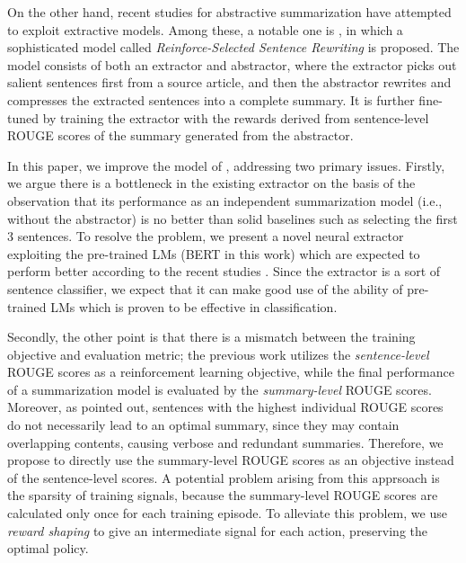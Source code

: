 \documentclass[11pt,a4paper]{article}
\begin{document}
On the other hand, recent 
studies for abstractive summarization \cite{chen-bansal-2018-fast, hsu-etal-2018-unified, gehrmann-etal-2018-bottom} have attempted to exploit extractive models.
Among these, a notable one is \citet{chen-bansal-2018-fast}, in which a sophisticated model called \emph{Reinforce-Selected Sentence Rewriting} is proposed.
The model consists of both an extractor and abstractor, where the extractor picks out salient sentences first from a source article, and then the abstractor rewrites and compresses the extracted sentences into a complete summary. 
It is further fine-tuned by training the extractor with the rewards derived from sentence-level ROUGE scores of the summary generated from the abstractor.



In this paper, we improve the model of \citet{chen-bansal-2018-fast}, addressing two primary issues.
Firstly, we argue there is a bottleneck in the existing extractor on the basis of the observation that its performance as an independent summarization model (i.e., without the abstractor) is no better than solid baselines such as selecting the first 3 sentences.
To resolve the problem, we present a novel neural extractor exploiting the pre-trained LMs (BERT in this work) which are expected to perform better according to the recent studies \cite{liu2019fine, zhang-etal-2019-hibert}.
Since the extractor is a sort of sentence classifier, we expect that it can make good use of the ability of pre-trained LMs which is proven to be effective in classification.



Secondly, the other point is that there is a mismatch between the training objective and evaluation metric; the previous work utilizes the \emph{sentence-level} ROUGE scores as a reinforcement learning objective, while the final performance of a summarization model is evaluated by the \emph{summary-level} ROUGE scores.
Moreover, as \citet{narayan-etal-2018-ranking} pointed out, sentences with the highest individual ROUGE scores do not necessarily lead to an optimal summary,
since they may contain overlapping contents, causing verbose and redundant summaries. 
Therefore, we propose to directly use the summary-level ROUGE scores as an objective instead of the sentence-level scores.
A potential problem arising from this apprsoach is the sparsity of training signals, because the summary-level ROUGE scores are calculated only once for each training episode.
To alleviate this problem, we use \emph{reward shaping} \cite{Ng:1999:PIU:645528.657613} to give an intermediate signal for each action, preserving the optimal policy.
\end{document}
